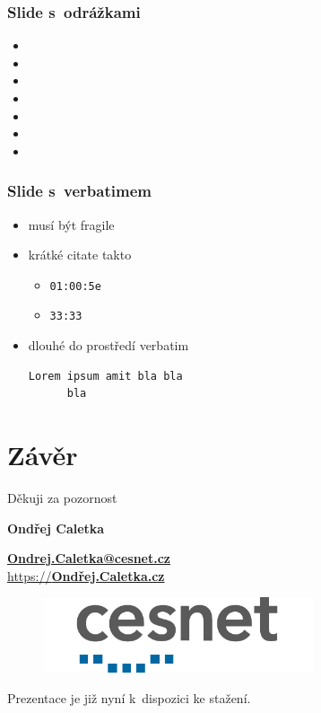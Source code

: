 \documentclass[hyperref={pdfpagelabels=false},xcolor=dvipsnames,12pt,aspectratio=169]{beamer}
\begin{document}
\begin{frame}
	\frametitle{Slide s~odrážkami}
	\begin{itemize}
		\item 
		\item 
		\item 
		\item 
		\item 
		\item 
		\item 
	\end{itemize}
\end{frame}

\begin{frame}[fragile]
	\frametitle{Slide s~verbatimem}
	\begin{itemize}
		\item musí být fragile
		\item krátké citate takto
		\begin{itemize}
				\item \verb|01:00:5e| 
				\item \verb|33:33|
		\end{itemize}
		\item dlouhé do prostředí verbatim
\begin{verbatim}
Lorem ipsum amit bla bla 
      bla
\end{verbatim}
	\end{itemize}
\end{frame}

\section*{Závěr}
{
\begin{frame}
 \begin{center}
  \large Děkuji za pozornost

  \vspace{2em}
  \textbf{Ondřej Caletka}

  \href{mailto:Ondrej.Caletka@cesnet.cz}{\textbf{Ondrej.Caletka@cesnet.cz}} \\
  \href{https://xn--ondej-kcb.caletka.cz}{https://\textbf{Ondřej.Caletka.cz}}
  \vspace{1em}
  \begin{figure}
  \includegraphics[width=8cm]{fig/cesnet_RGB_lrprotect}
  \end{figure}
 \end{center}
 \vspace{2em}
 \tiny Prezentace je již nyní k~dispozici ke stažení.
\end{frame}
}
\end{document}
